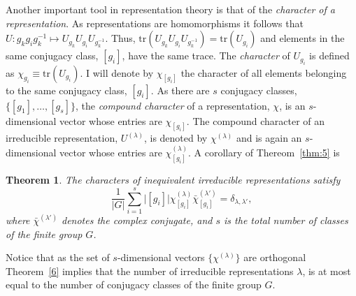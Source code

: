 \documentclass{article}
\newcommand\defn[1]{\textsl{#1}}
\newtheorem{theorem}{Theorem}
\begin{document}
Another important tool in representation theory is that of the \defn{character of a representation}.  As representations are homomorphisms it follows that $U:g_kg_ig_k^{-1}\mapsto U_{g_k}U_{g_i}U_{g_k^{-1}}$.  Thus, $\mathrm{tr}(U_{g_k}U_{g_i}U_{g_k^{-1}})=\mathrm{tr}(U_{g_i})$ and elements in the same conjugacy class, $[g_i]$, have the same trace.  The \defn{character} of $U_{g_i}$ is defined as $\chi_{g_i}\equiv\mathrm{tr}(U_{g_i})$. I will denote by $\chi_{[g_i]}$ the character of all elements belonging to the same conjugacy class, $[g_i]$. As there are $s$ conjugacy classes, $\{[g_1],\ldots,[g_s]\}$, the \defn{compound character} of a representation, $\chi$, is an $s$-dimensional vector whose entries are $\chi_{[g_i]}$.  The compound character of an irreducible representation, $U^{(\lambda)}$, is denoted by $\chi^{(\lambda)}$ and is again an $s$-dimensional vector whose entries are $\chi^{(\lambda)}_{[g_i]}$.   A corollary of Thereom~\ref{thm:5} is 
\begin{theorem}
The characters of inequivalent irreducible representations satisfy
\begin{equation}
\frac{1}{|G|}\sum_{i=1}^s \lvert[g_i]\rvert\chi^{(\lambda)}_{[g_i]}\bar{\chi}^{(\lambda')}_{[g_i]}=\delta_{\lambda,\lambda'},
\label{36}
\end{equation} 
where $\bar{\chi}^{(\lambda')}$ denotes the complex conjugate, and $s$ is the total number of classes of the finite group $G$.
\label{thm:6}
\end{theorem}
Notice that as the set of $s$-dimensional vectors $\{\chi^{(\lambda)}\}$ are orthogonal Theorem~\eqref{6} implies that the number of irreducible representations $\lambda$, is at most equal to the number of conjugacy classes of the finite group $G$.
\end{document}
